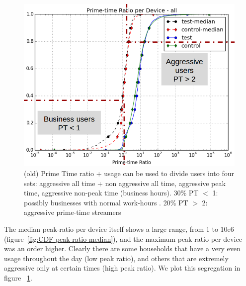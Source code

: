 \begin{figure}[ht]
\begin{minipage}{0.9\linewidth}
\centering
\includegraphics[width=0.9\linewidth]{figures/cdf-prime-time-ratio[replace].png}
\caption{(old) Prime Time ratio + usage can be used to divide users into four sets: aggressive all time + non aggressive all time, aggressive peak time, aggressive non-peak time (business hours). 30\% PT $<$ 1: possibly businesses with normal work-hours . 20\% PT $>$ 2: aggressive prime-time streamers}
\label{fig:CDF-prime-time-ratio}
\end{minipage}
\end{figure}

The median peak-ratio per device itself shows a large range, from 1 to 10e6 (figure~\ref{fig:CDF-peak-ratio-median}), and the maximum peak-ratio per device was an order higher. Clearly there are some households that have a very even usage throughout the day (low peak ratio), and others that are extremely aggressive only at certain times (high peak ratio). We plot this segregation in figure ~\ref{fig:CDF-prime-time-ratio}.



